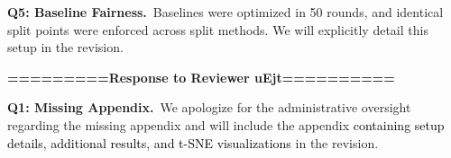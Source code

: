 \documentclass[10pt,twocolumn,letterpaper]{article}
\begin{document}
\begin{table}[t]
\vspace{-10pt}
\centering
\caption{Accuracy on CIFAR‑100 under partial participation (IID) and extreme non‑IID splits. 200 clients. Averaged over 5 runs.}
\label{tab:combined}
\tiny
{}
\end{table}

\noindent\textbf{Q5: Baseline Fairness.}~Baselines were optimized in 50 rounds, and identical split points were enforced across split methods. We will explicitly detail this setup in the revision.

\textbf{=========Response to Reviewer uEjt==========}

\noindent\textbf{Q1: Missing Appendix.}~We apologize for the administrative oversight regarding the missing appendix and will include the appendix \textcolor{black}{containing setup details, additional results, and t-SNE visualizations} in the revision. 
\end{document}
